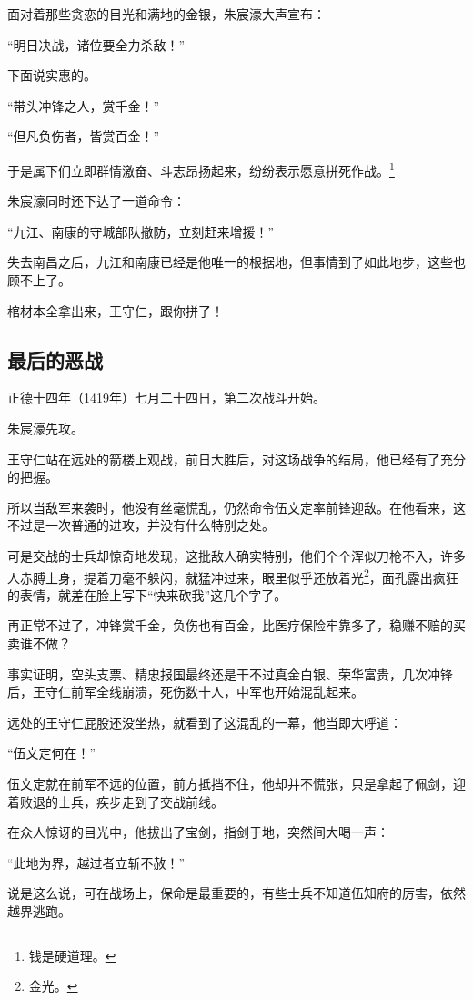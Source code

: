 \begin{multicols}{\theparacolNo}
		面对着那些贪恋的目光和满地的金银，朱宸濠大声宣布：

		“明日决战，诸位要全力杀敌！”

		下面说实惠的。

		“带头冲锋之人，赏千金！”

		“但凡负伤者，皆赏百金！”

		于是属下们立即群情激奋、斗志昂扬起来，纷纷表示愿意拼死作战。\footnote{钱是硬道理。}

		朱宸濠同时还下达了一道命令：

		“九江、南康的守城部队撤防，立刻赶来增援！”

		失去南昌之后，九江和南康已经是他唯一的根据地，但事情到了如此地步，这些也顾不上了。

		棺材本全拿出来，王守仁，跟你拼了！

		\subsection{最后的恶战}
		正德十四年（1419年）七月二十四日，第二次战斗开始。

		朱宸濠先攻。

		王守仁站在远处的箭楼上观战，前日大胜后，对这场战争的结局，他已经有了充分的把握。

		所以当敌军来袭时，他没有丝毫慌乱，仍然命令伍文定率前锋迎敌。在他看来，这不过是一次普通的进攻，并没有什么特别之处。

		可是交战的士兵却惊奇地发现，这批敌人确实特别，他们个个浑似刀枪不入，许多人赤膊上身，提着刀毫不躲闪，就猛冲过来，眼里似乎还放着光\footnote{金光。}，面孔露出疯狂的表情，就差在脸上写下“快来砍我”这几个字了。

		再正常不过了，冲锋赏千金，负伤也有百金，比医疗保险牢靠多了，稳赚不赔的买卖谁不做？

		事实证明，空头支票、精忠报国最终还是干不过真金白银、荣华富贵，几次冲锋后，王守仁前军全线崩溃，死伤数十人，中军也开始混乱起来。

		远处的王守仁屁股还没坐热，就看到了这混乱的一幕，他当即大呼道：

		“伍文定何在！”

		伍文定就在前军不远的位置，前方抵挡不住，他却并不慌张，只是拿起了佩剑，迎着败退的士兵，疾步走到了交战前线。

		在众人惊讶的目光中，他拔出了宝剑，指剑于地，突然间大喝一声：

		“此地为界，越过者立斩不赦！”

		说是这么说，可在战场上，保命是最重要的，有些士兵不知道伍知府的厉害，依然越界逃跑。


\end{multicols}
